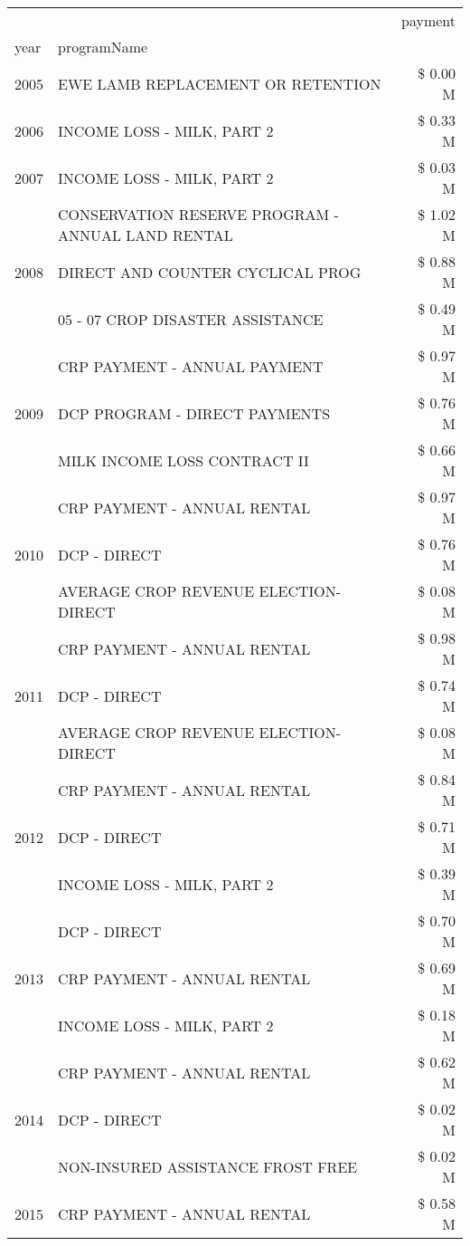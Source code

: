 \begin{tabular}{llr}
\toprule
 &  & payment \\
year & programName &  \\
\midrule
2005 & EWE LAMB REPLACEMENT OR RETENTION & \$ 0.00 M \\
\cline{1-3}
2006 & INCOME LOSS - MILK, PART 2 & \$ 0.33 M \\
\cline{1-3}
2007 & INCOME LOSS - MILK, PART 2 & \$ 0.03 M \\
\cline{1-3}
\multirow[t]{3}{*}{2008} & CONSERVATION RESERVE PROGRAM - ANNUAL LAND RENTAL & \$ 1.02 M \\
 & DIRECT AND COUNTER CYCLICAL PROG & \$ 0.88 M \\
 & 05 - 07 CROP DISASTER ASSISTANCE & \$ 0.49 M \\
\cline{1-3}
\multirow[t]{3}{*}{2009} & CRP PAYMENT - ANNUAL PAYMENT & \$ 0.97 M \\
 & DCP PROGRAM - DIRECT PAYMENTS & \$ 0.76 M \\
 & MILK INCOME LOSS CONTRACT II & \$ 0.66 M \\
\cline{1-3}
\multirow[t]{3}{*}{2010} & CRP PAYMENT - ANNUAL RENTAL & \$ 0.97 M \\
 & DCP - DIRECT & \$ 0.76 M \\
 & AVERAGE CROP REVENUE ELECTION-DIRECT & \$ 0.08 M \\
\cline{1-3}
\multirow[t]{3}{*}{2011} & CRP PAYMENT - ANNUAL RENTAL & \$ 0.98 M \\
 & DCP - DIRECT & \$ 0.74 M \\
 & AVERAGE CROP REVENUE ELECTION-DIRECT & \$ 0.08 M \\
\cline{1-3}
\multirow[t]{3}{*}{2012} & CRP PAYMENT - ANNUAL RENTAL & \$ 0.84 M \\
 & DCP - DIRECT & \$ 0.71 M \\
 & INCOME LOSS - MILK, PART 2 & \$ 0.39 M \\
\cline{1-3}
\multirow[t]{3}{*}{2013} & DCP - DIRECT & \$ 0.70 M \\
 & CRP PAYMENT - ANNUAL RENTAL & \$ 0.69 M \\
 & INCOME LOSS - MILK, PART 2 & \$ 0.18 M \\
\cline{1-3}
\multirow[t]{3}{*}{2014} & CRP PAYMENT - ANNUAL RENTAL & \$ 0.62 M \\
 & DCP - DIRECT & \$ 0.02 M \\
 & NON-INSURED ASSISTANCE FROST FREE & \$ 0.02 M \\
\cline{1-3}
\multirow[t]{3}{*}{2015} & CRP PAYMENT - ANNUAL RENTAL & \$ 0.58 M \\

\end{tabular}
